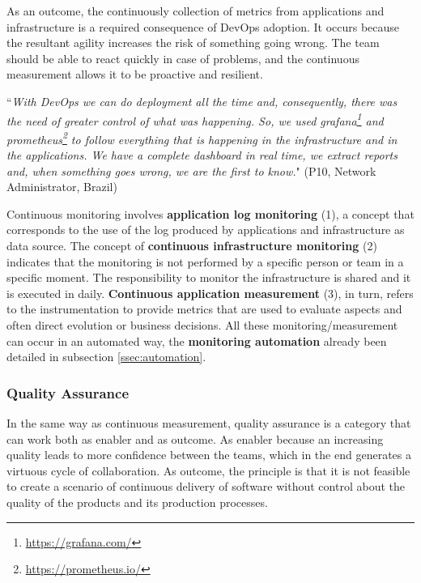 As an outcome, the continuously collection of metrics from applications and
infrastructure is a required consequence of DevOps adoption. It occurs because
the resultant agility increases the risk of something going wrong. The team
should be able to react quickly in case of problems, and the continuous
measurement allows it to be proactive and resilient.

\begin{mq}
``\emph{With DevOps we can do deployment all the time and, consequently, there was
the need of greater control of what was happening. So, we used
grafana\footnote{\url{https://grafana.com/}} and
prometheus\footnote{\url{https://prometheus.io/}} to follow everything that is
happening in the infrastructure and in the applications. We have a complete
dashboard in real time, we extract reports and, when something goes wrong, we
are the first to know.}" (P10, Network Administrator, Brazil)
\end{mq}

Continuous monitoring involves \textbf{application log monitoring} (1), a
concept that corresponds to the use of the log produced by
applications and infrastructure as data source. The concept of
\textbf{continuous infrastructure monitoring} (2) indicates that the monitoring
is not performed by a specific person or team in a specific moment. The
responsibility to monitor the infrastructure is shared and it is executed in
daily. \textbf{Continuous application measurement} (3), in turn, refers to
the instrumentation to provide metrics that are used to evaluate aspects and
often direct evolution or business decisions. All these monitoring/measurement
can occur in an automated way, the \textbf{monitoring automation} already been
detailed in subsection \ref{ssec:automation}.

\subsubsection{Quality Assurance}

In the same way as continuous measurement, quality assurance is a category that
can work both as enabler and as outcome. As enabler because an increasing quality
leads to more confidence between the teams, which in the end generates a virtuous 
cycle of collaboration. As outcome, the principle is that it is not
feasible to create a scenario of continuous delivery of software without control
about the quality of the products and its production processes.

